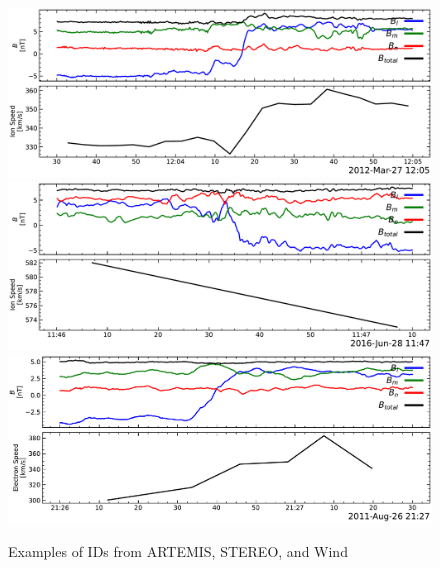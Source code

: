 \documentclass[
]{agujournal2019}
\begin{document}
\begin{figure}

\begin{minipage}{0.25\linewidth}
\includegraphics{figures/examples/artemis_id_example.pdf}\end{minipage}%
%
\begin{minipage}{0.25\linewidth}
\includegraphics{figures/examples/stereo_id_example.pdf}\end{minipage}%
%
\begin{minipage}{0.25\linewidth}
\includegraphics{figures/examples/wind_id_example.pdf}\end{minipage}%
%
\begin{minipage}{0.25\linewidth}
Examples of IDs from ARTEMIS, STEREO, and Wind\end{minipage}%

\end{figure}%
\end{document}
